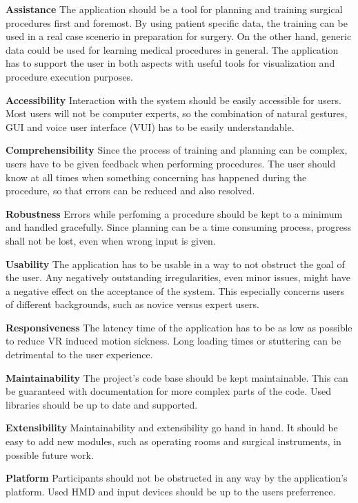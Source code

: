 \begin{compactenum}[label=(NF \arabic*)]
    \item \label{req::N1}\textbf{Assistance} The application should be a tool for planning and training surgical procedures first and foremost.
    By using patient specific data, the training can be used in a real case scenerio in preparation for surgery.
    On the other hand, generic data could be used for learning medical procedures in general.
    The application has to support the user in both aspects with useful tools for visualization and procedure execution purposes.
    \item \label{req::N2}\textbf{Accessibility} Interaction with the system should be easily accessible for users.
    Most users will not be computer experts, so the combination of natural gestures, GUI and voice user interface (VUI) has to be easily understandable.
    \item \label{req::N3}\textbf{Comprehensibility} Since the process of training and planning can be complex, users have to be given feedback when performing procedures.
    The user should know at all times when something concerning has happened during the procedure, so that errors can be reduced and also resolved.
    \item \label{req::N4}\textbf{Robustness} Errors while perfoming a procedure should be kept to a minimum and handled gracefully.
    Since planning can be a time consuming process, progress shall not be lost, even when wrong input is given.
    \item \label{req::N5}\textbf{Usability} The application has to be usable in a way to not obstruct the goal of the user.
    Any negatively outstanding irregularities, even minor issues, might have a negative effect on the acceptance of the system.
    This especially concerns users of different backgrounds, such as novice versus expert users.
    \item \label{req::N6}\textbf{Responsiveness} The latency time of the application has to be as low as possible to reduce VR induced motion sickness.
    Long loading times or stuttering can be detrimental to the user experience.
    \item \label{req::N7}\textbf{Maintainability} The project’s code base should be kept maintainable.
    This can be guaranteed with documentation for more complex parts of the code.
    Used libraries should be up to date and supported.
    \item \label{req::N8}\textbf{Extensibility} Maintainability and extensibility go hand in hand.
    It should be easy to add new modules, such as operating rooms and surgical instruments, in possible future work.
    \item \label{req::N9}\textbf{Platform} Participants should not be obstructed in any way by the application's platform.
    Used HMD and input devices should be up to the users preferrence.
\end{compactenum}